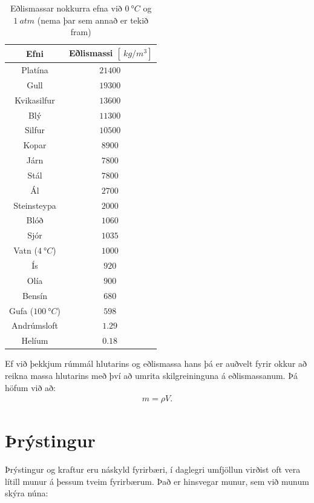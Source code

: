 \ifdefined \wholebook \else\documentclass[oneside]{book}\usepackage{EdlBook}\graphicspath{{figures/}}
\begin{document}
\begin{table}[H]
\begin{center}
\begin{tabular}{|c|c|}
\hline
\textbf{Efni} & \textbf{Eðlismassi $[\SI{}{kg/m^3}]$} \\
\hline
Platína & $\SI{21400}{}$ \\
Gull & $\SI{19300}{}$ \\
Kvikasilfur & $\SI{13600}{}$ \\
Blý & $\SI{11300}{}$ \\
Silfur & $\SI{10500}{}$ \\
Kopar & $\SI{8900}{}$ \\
Járn & $\SI{7800}{}$ \\
Stál & $\SI{7800}{}$ \\
Ál & $\SI{2700}{}$ \\
Steinsteypa & $\SI{2000}{}$ \\
Blóð & $\SI{1060}{}$ \\
Sjór & $\SI{1035}{}$ \\
Vatn ($\SI{4}{\degree C}$) & $\SI{1000}{}$ \\
Ís & $\SI{920}{}$ \\
Olía & $\SI{900}{}$ \\
Bensín & $\SI{680}{}$ \\
Gufa ($\SI{100}{\degree C}$) & $\SI{598}{}$ \\
Andrúmsloft & $\SI{1.29}{}$ \\
Helíum & $\SI{0.18}{}$ \\
\hline
\end{tabular}
\caption{Eðlismassar nokkurra efna við $\SI{0}{\degree C}$ og $\SI{1}{atm}$ (nema þar sem annað er tekið fram)}
\label{tafla:einingakerfi}
\end{center}
\end{table}

Ef við þekkjum rúmmál hlutarins og eðlismassa hans þá er auðvelt fyrir okkur að reikna massa hlutarins með því að umrita skilgreininguna á eðlismassanum. Þá höfum við að:
\begin{align*}
    m = \rho V.
\end{align*}

\section{Þrýstingur}
Þrýstingur og kraftur eru náskyld fyrirbæri, í daglegri umfjöllun virðist oft vera lítill munur á þessum tveim fyrirbærum. Það er hinsvegar munur, sem við munum skýra núna:
\end{document}
